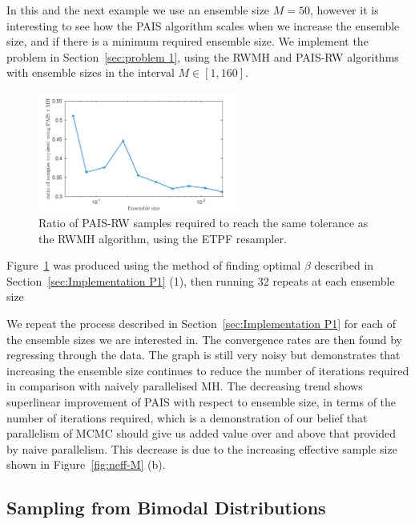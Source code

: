 \documentclass[final]{siamltex}
\begin{document}
In this and the next example we use an ensemble size $M=50$, however it is
interesting to see how the PAIS algorithm scales when we increase the
ensemble size, and if there is a minimum required ensemble size. We
implement the problem in Section~\ref{sec:problem 1}, using
the RWMH and PAIS-RW algorithms with ensemble sizes in the interval $M
\in [1, 160]$.

\begin{figure}[ht]
\begin{center}
\includegraphics[width=0.6\textwidth]{"figures/PAIS_saving"}
\caption{Ratio of PAIS-RW samples required to reach the same tolerance
  as the RWMH algorithm, using the ETPF resampler.}
\label{fig:PAIS_saving}
\end{center}
\end{figure}

Figure~\ref{fig:PAIS_saving} was produced using the method of finding
optimal $\beta$ described in Section~\ref{sec:Implementation P1} (1),
then running 32 repeats at each ensemble size

We repeat the process described in Section~\ref{sec:Implementation P1}
for each of the ensemble sizes we are interested in. The convergence rates
are then found by regressing through the data. The graph is still very
noisy but demonstrates that increasing the ensemble size continues to
reduce the number of iterations required in comparison with naively
parallelised MH. The decreasing trend shows superlinear improvement of
PAIS with respect to ensemble size, in terms of the number of
iterations required, which is a demonstration of our belief that
parallelism of MCMC should give us added value over and above that
provided by naive parallelism. This decrease is due to the increasing
effective sample size shown in Figure~\ref{fig:neff-M} (b).


\subsection{Sampling from Bimodal Distributions}
\label{sec:bimodal}
\end{document}
